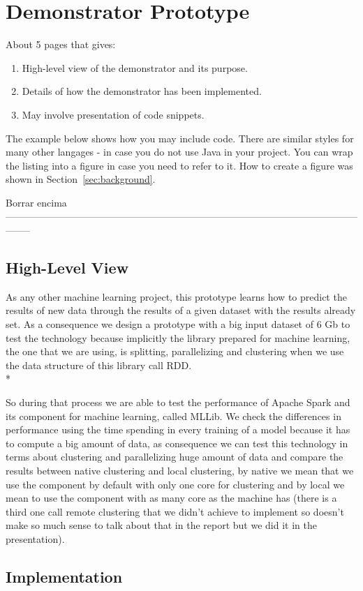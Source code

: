 \section{Demonstrator Prototype}
\label{sec:prototype}

About 5 pages that gives:

\begin{enumerate}
  
\item High-level view of the demonstrator and its purpose.

\item Details of how the demonstrator has been implemented.

\item May involve presentation of code snippets.

\end{enumerate}

The example below shows how you may include code. There are similar
styles for many other langages - in case you do not use Java in your
project. You can wrap the listing into a figure in case you need to
refer to it. How to create a figure was shown in Section~\ref{sec:background}.
  


Borrar encima --------------------------------------------------------------------------------------------------------------------



\subsection{High-Level View}
As any other machine learning project, this prototype learns how to predict the results of new data through the results of a given dataset with the results already set. As a consequence we design a prototype with a big input dataset of 6 Gb to test the technology because implicitly the library prepared for machine learning, the one that we are using, is splitting, parallelizing and clustering when we use the data structure of this library call RDD.\\*

So during that process we are able to test the performance of Apache Spark and its component for machine learning, called MLLib. 
We check the differences in performance using the time spending in every training of a model because it has to compute a big amount of data, as consequence we can test this technology in terms about clustering and parallelizing huge amount of data and compare the results between native clustering and local clustering, by native we mean that we use the component by default with only one core for clustering and by local we mean to use the component with as many core as the machine has (there is a third one call remote clustering that we didn’t achieve to implement so doesn’t make so much sense to talk about that in the report but we did it in the presentation).

\subsection{Implementation}